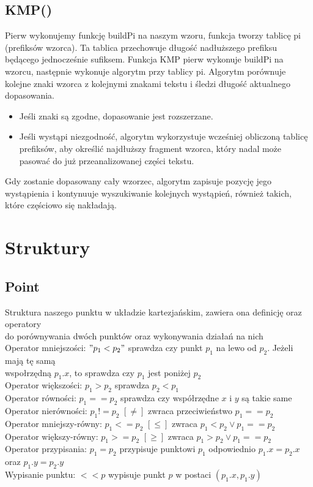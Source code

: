 \documentclass{article}
\begin{document}
\subsection{KMP()}
Pierw wykonujemy funkcję buildPi na naszym wzoru, funkcja tworzy tablicę pi (prefiksów wzorca). Ta tablica przechowuje długość nadłuższego prefiksu będącego jednocześnie sufiksem. Funkcja KMP pierw wykonuje buildPi na wzorcu, następnie wykonuje algorytm przy tablicy pi. Algorytm porównuje kolejne znaki wzorca z kolejnymi znakami tekstu i śledzi długość aktualnego dopasowania.
\begin{itemize}
    \item Jeśli znaki są zgodne, dopasowanie jest rozszerzane.
    \item Jeśli wystąpi niezgodność, algorytm wykorzystuje wcześniej obliczoną tablicę prefiksów, aby określić najdłuższy fragment wzorca, który nadal może pasować do już przeanalizowanej części tekstu.
\end{itemize}
Gdy zostanie dopasowany cały wzorzec, algorytm zapisuje pozycję jego wystąpienia i kontynuuje wyszukiwanie kolejnych wystąpień, również takich, które częściowo się nakładają.



\section{Struktury}

\subsection{Point}
Struktura naszego punktu w układzie kartezjańskim, zawiera ona definicję oraz operatory \\ do porównywania dwóch punktów oraz wykonywania działań na nich \\ Operator mniejszości: $"p_1 < p_2"$ sprawdza czy punkt $p_1$ na lewo od $p_2$. Jeżeli mają tę samą \\ wspołrzędną $p_1.x$, to sprawdza czy $p_1$ jest poniżej $p_2$ \\ Operator większości: $p_1 > p_2$ sprawdza $p_2 < p_1$ \\ Operator równości: $p_1 == p_2$ sprawdza czy współrzędne $x$ i $y$ są takie same \\ Operator nierówności: $p_1 != p_2$ $[\neq]$ zwraca przeciwieństwo $p_1 == p_2$ \\ Operator mniejszy-równy: $p_1 <= p_2$ $[\leq]$ zwraca $p_1 < p_2 \vee  p_1 == p_2$ \\ Operator większy-równy: $p_1 >= p_2$ $[\geq]$ zwraca $p_1 > p_2 \vee p_1 == p_2$ \\ Operator przypisania: $p_1 = p_2$ przypisuje punktowi $p_1$ odpowiednio $p_1.x = p_2.x$ oraz $p_1.y = p_2.y$ \\ Wypisanie punktu: $<<p$ wypisuje punkt $p$ w postaci $(p_1.x, p_1.y)$

\end{document}
